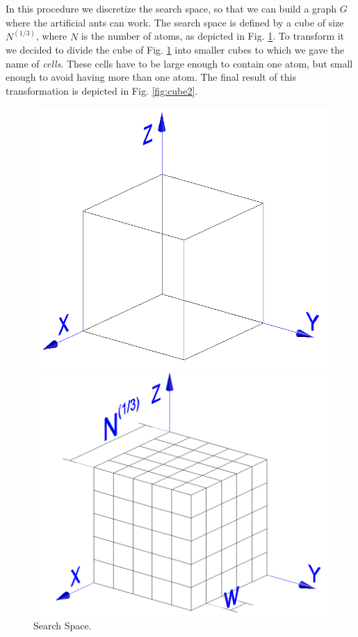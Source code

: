 	In this procedure we discretize the search space, so that we can build a graph $G$ where the artificial ants can work.
	The search space is defined by a cube of size $N^{(1/3)}$, where $N$ is the number of atoms, as depicted in Fig. \ref{fig:cube1}. To transform it we decided to divide the cube of Fig. \ref{fig:cube1} into smaller cubes to which we gave the name of \emph{cells}. These cells have to be large enough to contain one atom, but small enough to avoid having more than one atom. The final result of this transformation is depicted in Fig. \ref{fig:cube2}.
	
	\begin{figure}[t]
	\begin{minipage}[b]{0.5\linewidth}
	\centering
	\includegraphics[scale=0.25]{pictures/cube1}
	\caption{Search Space.}
	\label{fig:cube1}
	\end{minipage}
	\hspace{0.5cm}
	\begin{minipage}[b]{0.5\linewidth}
	\centering
	\includegraphics[scale=0.25]{pictures/cube2}

\end{minipage}
\end{figure}
